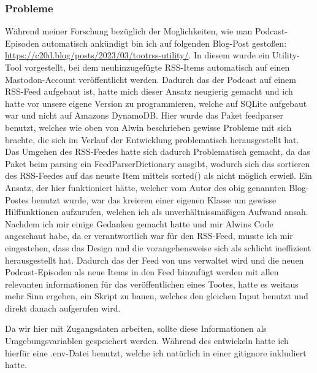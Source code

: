 \documentclass{article}
\begin{document}
\subsubsection{Probleme}
\begin{sloppypar}
Während meiner Forschung bezüglich der Moglichkeiten, wie man Podcast-Episoden automatisch ankündigt bin ich auf folgenden Blog-Post gestoßen: \url{https://c20d.blog/posts/2023/03/tootrss-utility/}. In diesem wurde ein Utility-Tool vorgestellt, bei dem neuhinzugefügte RSS-Items automatisch auf einen Mastodon-Account veröffentlicht werden. Dadurch das der Podcast auf einem RSS-Feed aufgebaut ist, hatte mich dieser Ansatz neugierig gemacht und ich hatte vor unsere eigene Version zu programmieren, welche auf SQLite aufgebaut war und nicht auf Amazons DynamoDB. Hier wurde das Paket feedparser benutzt, welches wie oben von Alwin beschrieben gewisse Probleme mit sich brachte, die sich im Verlauf der Entwicklung problematisch herausgestellt hat. Das Umgehen des RSS-Feedes hatte sich dadurch Problematisch gemacht, da das Paket beim parsing ein FeedParserDictionary ausgibt, wodurch sich das sortieren des RSS-Feedes auf das neuste Item mittels sorted() als nicht möglich erwieß. Ein Ansatz, der hier funktioniert hätte, welcher vom Autor des obig genannten Blog-Postes benutzt wurde, war das kreieren einer eigenen Klasse um gewisse Hilffunktionen aufzurufen, welchen ich als unverhältnissmäßigen Aufwand ansah. Nachdem ich mir einige Gedanken gemacht hatte und mir Alwins Code angeschaut habe, da er verantwortlich war für den RSS-Feed, musste ich mir eingestehen, dass das Design und die vorangehensweise sich als schlicht ineffizient herausgestellt hat. Dadurch das der Feed von uns verwaltet wird und die neuen Podcast-Episoden als neue Items in den Feed hinzufügt werden mit allen relevanten informationen für das veröffentlichen eines Tootes, hatte es weitaus mehr Sinn ergeben, ein Skript zu bauen, welches den gleichen Input benutzt und direkt danach aufgerufen wird.
\end{sloppypar}

Da wir hier mit Zugangsdaten arbeiten, sollte diese Informationen als Umgebungsvariablen gespeichert werden. Während des entwickeln hatte ich hierfür eine .env-Datei benutzt, welche ich natürlich in einer gitignore inkludiert hatte.
\end{document}
